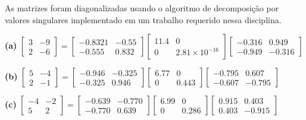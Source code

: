 \begin{resolution}
  As matrizes foram diagonalizadas usando o algoritmo de decomposição por valores singulares implementado em um trabalho requerido nessa disciplina.

  \vspace{12pt}
  {\bf (a)}\; $\begin{bmatrix}
      3 & -9 \\ 2 & -6
    \end{bmatrix} = \begin{bmatrix}
      -0.8321 & -0.55 \\
      -0.555  & 0.832
    \end{bmatrix} \begin{bmatrix}
      11.4 & 0 \\ 0 & 2.81 \times 10^{-16}
    \end{bmatrix} \begin{bmatrix}
      -0.316 & 0.949 \\ -0.949 & -0.316
    \end{bmatrix}$

  \vspace{12pt}
  {\bf (b)}\; $\begin{bmatrix}
      5 & -4 \\ 2 & -1
    \end{bmatrix} = \begin{bmatrix}
      -0.946 & -0.325 \\
      -0.325 & 0.946
    \end{bmatrix} \begin{bmatrix}
      6.77 & 0 \\ 0 & 0.443
    \end{bmatrix} \begin{bmatrix}
      -0.795 & 0.607 \\ -0.607 & -0.795
    \end{bmatrix}$

  \vspace{12pt}
  {\bf (c)}\; $\begin{bmatrix}
      -4 & -2 \\ 5 & 2
    \end{bmatrix} = \begin{bmatrix}
      -0.639 & -0.770 \\
      -0.770 & 0.639
    \end{bmatrix} \begin{bmatrix}
      6.99 & 0 \\ 0 & 0.286
    \end{bmatrix} \begin{bmatrix}
      0.915 & 0.403 \\ 0.403 & -0.915
    \end{bmatrix}$


\end{resolution}
